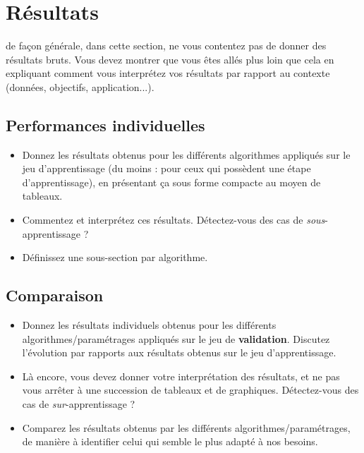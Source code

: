 \documentclass{ceri/sty/rapport}
\begin{document}
\section{Résultats}
\label{sec:Resultats}
\begin{beware}[Attention]
de façon générale, dans cette section, ne vous contentez pas de donner des résultats bruts. Vous devez montrer que vous êtes allés plus loin que cela en expliquant comment vous interprétez vos résultats par rapport au contexte (données, objectifs, application...).
\end{beware}




\subsection{Performances individuelles}
\begin{itemize}
	\item Donnez les résultats obtenus pour les différents algorithmes appliqués sur le jeu d'apprentissage (du moins : pour ceux qui possèdent une étape d'apprentissage), en présentant ça sous forme compacte au moyen de tableaux.
	\item Commentez et interprétez ces résultats. Détectez-vous des cas de \textit{sous}-apprentissage ?
	\item Définissez une sous-section par algorithme.
\end{itemize}





\subsection{Comparaison}
\begin{itemize}
	\item Donnez les résultats individuels obtenus pour les différents algorithmes/paramétrages appliqués sur le jeu de \textbf{validation}. Discutez l'évolution par rapports aux résultats obtenus sur le jeu d'apprentissage.
	\item Là encore, vous devez donner votre interprétation des résultats, et ne pas vous arrêter à une succession de tableaux et de graphiques. Détectez-vous des cas de \textit{sur}-apprentissage ?
	\item Comparez les résultats obtenus par les différents algorithmes/paramétrages, de manière à identifier celui qui semble le plus adapté à nos besoins.
\end{itemize}
\end{document}
